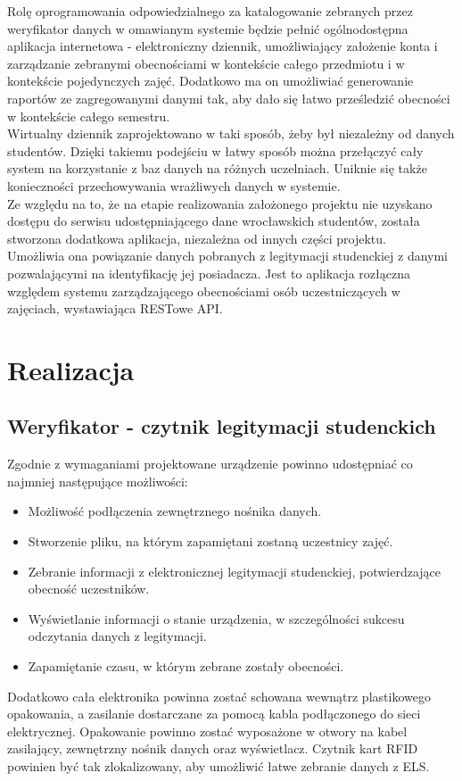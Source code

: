 \documentclass[declaration,shortabstract, mgr]{iithesis}
\begin{document}
\indent Rolę oprogramowania odpowiedzialnego za katalogowanie zebranych przez weryfikator danych w omawianym systemie będzie pełnić ogólnodostępna aplikacja internetowa - elektroniczny dziennik, umożliwiający założenie konta i zarządzanie zebranymi obecnościami w kontekście całego przedmiotu i w kontekście pojedynczych zajęć. Dodatkowo ma on umożliwiać generowanie raportów ze zagregowanymi danymi tak, aby dało się łatwo prześledzić obecności w kontekście całego semestru. \\
\indent Wirtualny dziennik zaprojektowano w taki sposób, żeby był niezależny od danych studentów. Dzięki takiemu podejściu w łatwy sposób można przełączyć cały system na korzystanie z baz danych na różnych uczelniach. Uniknie się także konieczności przechowywania wrażliwych danych w systemie. \\
\indent Ze względu na to, że na etapie realizowania założonego projektu nie uzyskano dostępu do serwisu udostępniającego dane wrocławskich studentów, została stworzona dodatkowa aplikacja, niezależna od innych części projektu. \\
\indent Umożliwia ona powiązanie danych pobranych z legitymacji studenckiej z danymi pozwalającymi na identyfikację jej posiadacza. Jest to aplikacja rozłączna względem systemu zarządzającego obecnościami osób uczestniczących w zajęciach, wystawiająca RESTowe API.

\chapter{Realizacja}
\section{Weryfikator - czytnik legitymacji studenckich}
\indent Zgodnie z wymaganiami projektowane urządzenie powinno udostępniać co najmniej następujące możliwości:
\begin{itemize}
\item Możliwość podłączenia zewnętrznego nośnika danych.
\item Stworzenie pliku, na którym zapamiętani zostaną uczestnicy zajęć.
\item Zebranie informacji z elektronicznej legitymacji studenckiej, potwierdzające obecność uczestników.
\item Wyświetlanie informacji o stanie urządzenia, w szczególności sukcesu odczytania danych z legitymacji.
\item Zapamiętanie czasu, w którym zebrane zostały obecności.
\end{itemize}
\indent Dodatkowo cała elektronika powinna zostać schowana wewnątrz plastikowego opakowania, a zasilanie dostarczane za pomocą kabla podłączonego do sieci elektrycznej. Opakowanie powinno zostać wyposażone w otwory na kabel zasilający, zewnętrzny nośnik danych oraz wyświetlacz. Czytnik kart RFID powinien być tak zlokalizowany, aby umożliwić łatwe zebranie danych z ELS.
\end{document}
